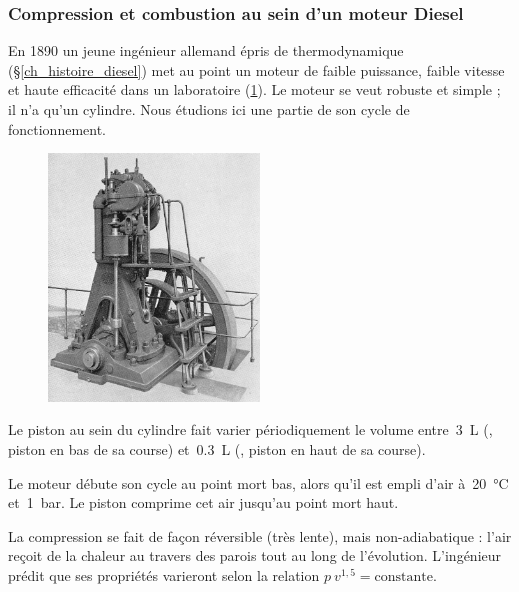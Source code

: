 \subsubsection{Compression et combustion au sein d’un moteur Diesel}
\label{exo_compression_combustion_diesel}

	En 1890 un jeune ingénieur allemand épris de thermodynamique (\S\ref{ch_histoire_diesel}) met au point un moteur de faible puissance, faible vitesse et haute efficacité dans un laboratoire (\cref{fig_exo_moteur_diesel}). Le moteur se veut robuste et simple ; il n’a qu’un cylindre. Nous étudions ici une partie de son cycle de fonctionnement. %
	
	\begin{figure}
		\begin{center}
			\includegraphics[width=0.5\textwidth]{images/Dieselmotor_1898_retouched.jpg}
		\end{center}
		\label{fig_exo_moteur_diesel}
	\end{figure}
	
	Le piston au sein du cylindre fait varier périodiquement le volume entre~\SI{3}{\liter} (, piston en bas de sa course) et~\SI{0,3}{\liter} (, piston en haut de sa course).
	
	Le moteur débute son cycle au point mort bas, alors qu’il est empli d’air à~\SI{20}{\degreeCelsius} et~\SI{1}{\bar}. Le piston comprime cet air jusqu’au point mort haut.
	
	La compression se fait de façon réversible (très lente), mais non-adiabatique : l’air reçoit de la chaleur au travers des parois tout au long de l’évolution. L’ingénieur prédit que ses propriétés varieront selon la relation $p \ v^{1,5} = \text{constante}$.


